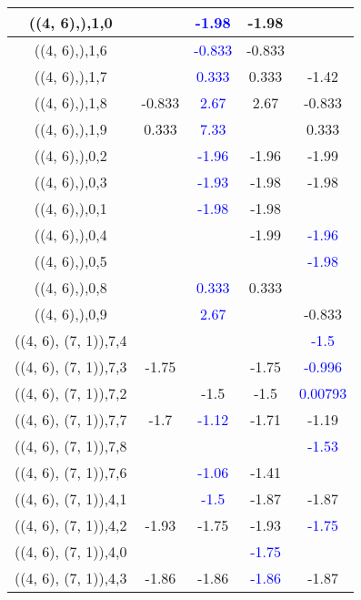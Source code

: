 \documentclass{article}
\begin{document}
\begin{center}
\begin{longtable}{|c|c|c|c|c|}
        	\hline
        	((4, 6),),1,0&& \textcolor{blue}{-1.98}&-1.98&\\
        	\hline
        	((4, 6),),1,6&& \textcolor{blue}{-0.833}&-0.833&\\
        	\hline
        	((4, 6),),1,7&& \textcolor{blue}{0.333}&0.333&-1.42\\
        	\hline
        	((4, 6),),1,8&-0.833& \textcolor{blue}{2.67}&2.67&-0.833\\
        	\hline
        	((4, 6),),1,9&0.333& \textcolor{blue}{7.33}&&0.333\\
        	\hline
        	((4, 6),),0,2&& \textcolor{blue}{-1.96}&-1.96&-1.99\\
        	\hline
        	((4, 6),),0,3&& \textcolor{blue}{-1.93}&-1.98&-1.98\\
        	\hline
        	((4, 6),),0,1&& \textcolor{blue}{-1.98}&-1.98&\\
        	\hline
        	((4, 6),),0,4&&&-1.99& \textcolor{blue}{-1.96}\\
        	\hline
        	((4, 6),),0,5&&&& \textcolor{blue}{-1.98}\\
        	\hline
        	((4, 6),),0,8&& \textcolor{blue}{0.333}&0.333&\\
        	\hline
        	((4, 6),),0,9&& \textcolor{blue}{2.67}&&-0.833\\
        	\hline
        	((4, 6), (7, 1)),7,4&&&& \textcolor{blue}{-1.5}\\
        	\hline
        	((4, 6), (7, 1)),7,3&-1.75&&-1.75& \textcolor{blue}{-0.996}\\
        	\hline
        	((4, 6), (7, 1)),7,2&&-1.5&-1.5& \textcolor{blue}{0.00793}\\
        	\hline
        	((4, 6), (7, 1)),7,7&-1.7& \textcolor{blue}{-1.12}&-1.71&-1.19\\
        	\hline
        	((4, 6), (7, 1)),7,8&&&& \textcolor{blue}{-1.53}\\
        	\hline
        	((4, 6), (7, 1)),7,6&& \textcolor{blue}{-1.06}&-1.41&\\
        	\hline
        	((4, 6), (7, 1)),4,1&& \textcolor{blue}{-1.5}&-1.87&-1.87\\
        	\hline
        	((4, 6), (7, 1)),4,2&-1.93&-1.75&-1.93& \textcolor{blue}{-1.75}\\
        	\hline
        	((4, 6), (7, 1)),4,0&&& \textcolor{blue}{-1.75}&\\
        	\hline
        	((4, 6), (7, 1)),4,3&-1.86&-1.86& \textcolor{blue}{-1.86}&-1.87\\

\end{longtable}
\end{center}
\end{document}

